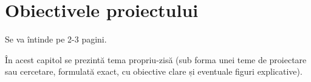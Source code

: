 \chapter{Obiectivele proiectului}\label{ch:obiective}
\pagestyle{fancy}

{\noindent\color{blue}Se va întinde pe 2-3 pagini.\\}

În acest capitol se prezintă tema propriu-zisă (sub forma unei teme de proiectare sau cercetare, formulată exact, cu obiective clare și eventuale figuri explicative).

